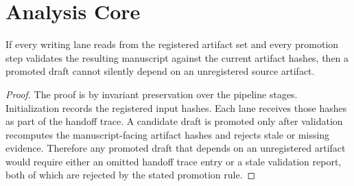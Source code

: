 \section{Analysis Core}
\begin{theorem}
If every writing lane reads from the registered artifact set and every promotion step validates the resulting manuscript against the current artifact hashes, then a promoted draft cannot silently depend on an unregistered source artifact.
\end{theorem}
\begin{proof}
The proof is by invariant preservation over the pipeline stages. Initialization records the registered input hashes. Each lane receives those hashes as part of the handoff trace. A candidate draft is promoted only after validation recomputes the manuscript-facing artifact hashes and rejects stale or missing evidence. Therefore any promoted draft that depends on an unregistered artifact would require either an omitted handoff trace entry or a stale validation report, both of which are rejected by the stated promotion rule.
\end{proof}
